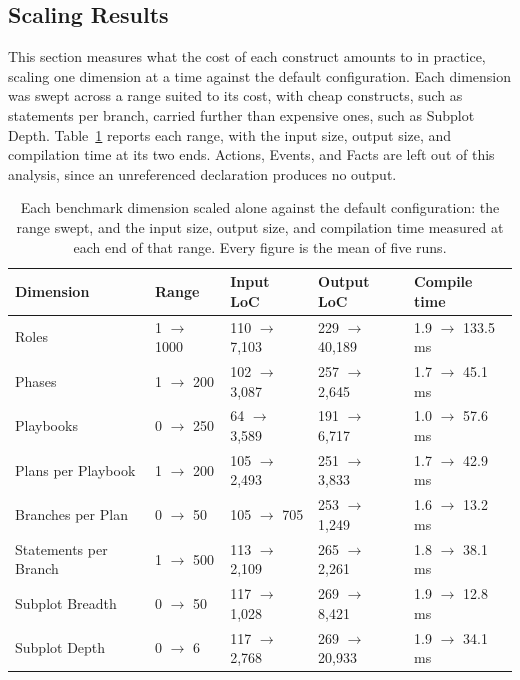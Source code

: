 \subsection{Scaling Results}
\label{sec:benchmark-results}
 
This section measures what the cost of each construct amounts to in practice, scaling one dimension at a time against the default configuration. Each dimension was swept across a range suited to its cost, with cheap constructs, such as statements per branch, carried further than expensive ones, such as Subplot Depth. Table~\ref{tab:benchmark-single-dimension} reports each range, with the input size, output size, and compilation time at its two ends. Actions, Events, and Facts are left out of this analysis, since an unreferenced declaration produces no output.

\begin{table}[htpb]
\centering
\small
\begin{tabular}{|l|l|l|l|l|}
\hline
\textbf{Dimension} & \textbf{Range} & \textbf{Input LoC} & \textbf{Output LoC} & \textbf{Compile time} \\
\hline
Roles                 & 1 $\to$ 1000 & 110 $\to$ 7{,}103 & 229 $\to$ 40{,}189 & 1.9 $\to$ 133.5\,ms \\
Phases                & 1 $\to$ 200  & 102 $\to$ 3{,}087 & 257 $\to$ 2{,}645  & 1.7 $\to$ 45.1\,ms \\
Playbooks             & 0 $\to$ 250  & 64 $\to$ 3{,}589  & 191 $\to$ 6{,}717  & 1.0 $\to$ 57.6\,ms \\
Plans per Playbook    & 1 $\to$ 200  & 105 $\to$ 2{,}493 & 251 $\to$ 3{,}833  & 1.7 $\to$ 42.9\,ms \\
Branches per Plan     & 0 $\to$ 50   & 105 $\to$ 705     & 253 $\to$ 1{,}249  & 1.6 $\to$ 13.2\,ms \\
Statements per Branch & 1 $\to$ 500  & 113 $\to$ 2{,}109 & 265 $\to$ 2{,}261  & 1.8 $\to$ 38.1\,ms \\
Subplot Breadth       & 0 $\to$ 50   & 117 $\to$ 1{,}028 & 269 $\to$ 8{,}421  & 1.9 $\to$ 12.8\,ms \\
Subplot Depth         & 0 $\to$ 6    & 117 $\to$ 2{,}768 & 269 $\to$ 20{,}933 & 1.9 $\to$ 34.1\,ms \\
\hline
\end{tabular}
\caption{Each benchmark dimension scaled alone against the default configuration: the range swept, and the input size, output size, and compilation time measured at each end of that range. Every figure is the mean of five runs.}
\label{tab:benchmark-single-dimension}
\end{table}
 
